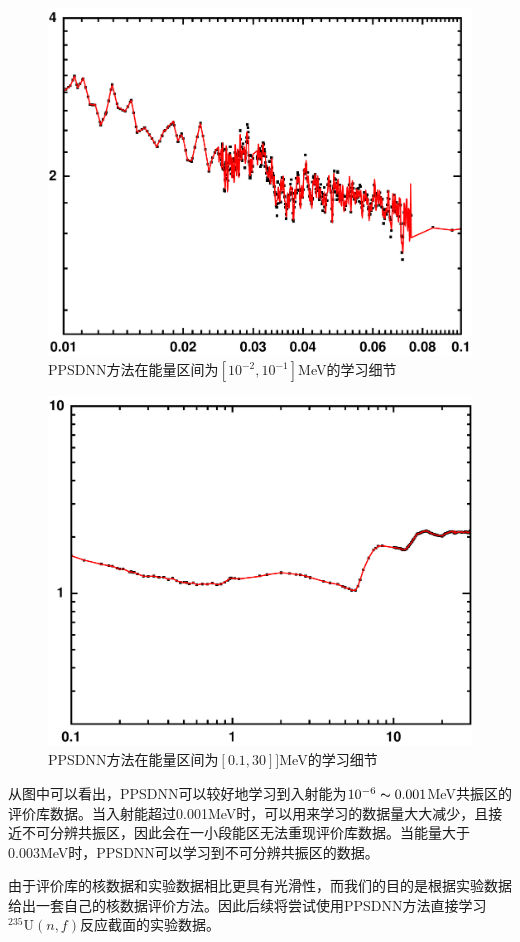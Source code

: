 \begin{figure}[htbp!]
  \centering
  \includegraphics[width=0.84\linewidth]{figures/endftrain/G2.pdf}
  \caption{PPSDNN方法在能量区间为$[10^{-2},10^{-1}]$MeV的学习细节}
  \label{endf2}
\end{figure}
\begin{figure}[htbp]
  \centering
  \includegraphics[width=0.84\linewidth]{figures/endftrain/G1.pdf}
  \caption{PPSDNN方法在能量区间为$[0.1,30]]$MeV的学习细节}
  \label{endf1}
\end{figure}
从图中可以看出，PPSDNN可以较好地学习到入射能为$10^{-6}\thicksim 0.001$MeV共振区的评价库数据。当入射能超过0.001MeV时，可以用来学习的数据量大大减少，且接近不可分辨共振区，因此会在一小段能区无法重现评价库数据。当能量大于0.003MeV时，PPSDNN可以学习到不可分辨共振区的数据。


由于评价库的核数据和实验数据相比更具有光滑性，而我们的目的是根据实验数据给出一套自己的核数据评价方法。因此后续将尝试使用PPSDNN方法直接学习$^{235}\text{U}(n,f)$反应截面的实验数据。






